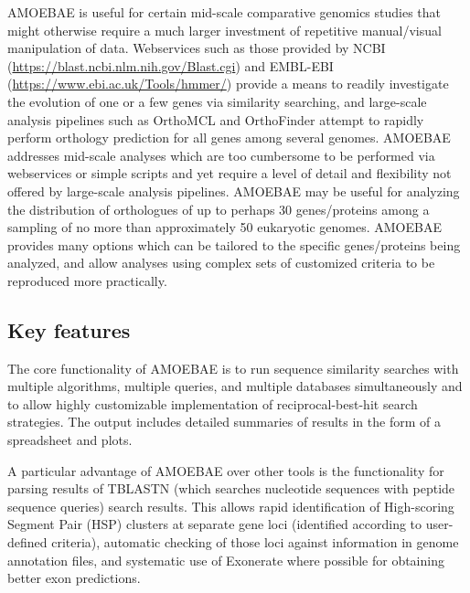 \documentclass[12pt,letterpaper]{article}
\begin{document}
\begin{linenumbers}
    AMOEBAE is useful for certain mid-scale comparative genomics studies that
    might otherwise require a much larger investment of repetitive
    manual/visual manipulation of data. Webservices such as those provided by
    NCBI (\url{https://blast.ncbi.nlm.nih.gov/Blast.cgi}) \citep{camacho2009}
    and EMBL-EBI (\url{https://www.ebi.ac.uk/Tools/hmmer/}) provide a means to
    readily investigate the evolution of one or a few genes via similarity searching,
    and large-scale analysis pipelines such as OrthoMCL \citep{li2003} and
    OrthoFinder \citep{emms2019} attempt to rapidly perform orthology
    prediction for all genes among several genomes. AMOEBAE addresses mid-scale
    analyses which are too cumbersome to be performed via webservices or simple
    scripts and yet require a level of detail and flexibility not offered by
    large-scale analysis pipelines. AMOEBAE may be useful for analyzing the
    distribution of orthologues of up to perhaps 30 genes/proteins among a
    sampling of no more than approximately 50 eukaryotic genomes. AMOEBAE
    provides many options which can be tailored to the specific genes/proteins
    being analyzed, and allow analyses using complex sets of customized
    criteria to be reproduced more practically.


\subsection{Key features}

The core functionality of AMOEBAE is to run sequence similarity searches with
    multiple algorithms, multiple queries, and multiple databases
    simultaneously and to allow highly customizable implementation of
    reciprocal-best-hit search strategies. The output includes detailed
    summaries of results in the form of a spreadsheet and plots.
    
    A particular advantage of AMOEBAE over other tools is the functionality for
    parsing results of TBLASTN (which searches nucleotide sequences with peptide
    sequence queries) search results. This allows rapid identification of
    High-scoring Segment Pair (HSP) clusters at separate gene loci (identified
    according to user-defined criteria), automatic checking of those loci
    against information in genome annotation files, and systematic use of
    Exonerate \citep{slater2005} where possible for obtaining better exon
    predictions.  



\end{linenumbers}
\end{document}
